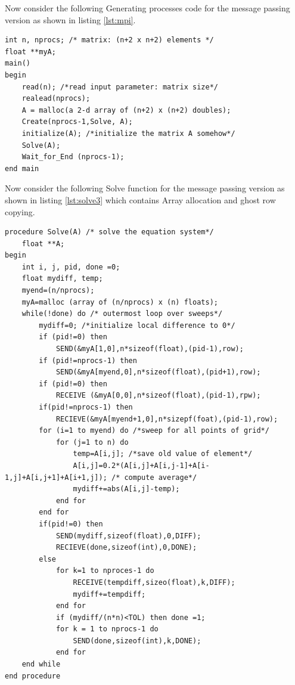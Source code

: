 \documentclass[12pt]{book}
\begin{document}
Now consider the following Generating processes code for the message passing version as shown in listing \ref{lst:mpi}.
\begin{lstlisting}[caption={Message Passing Version - Generating Processes},captionpos=b,label={lst:mpi}]
int n, nprocs; /* matrix: (n+2 x n+2) elements */
float **myA;
main()
begin
    read(n); /*read input parameter: matrix size*/
    realead(nprocs);
    A = malloc(a 2-d array of (n+2) x (n+2) doubles);
    Create(nprocs-1,Solve, A);
    initialize(A); /*initialize the matrix A somehow*/
    Solve(A);
    Wait_for_End (nprocs-1);
end main
\end{lstlisting}

Now consider the following Solve function for the message passing version as shown in listing \ref{lst:solve3}
which contains Array allocation and ghost row copying.
\begin{lstlisting}[caption={MPI - Solve Function},captionpos=b,label={lst:solve3}]
procedure Solve(A) /* solve the equation system*/
    float **A;
begin
    int i, j, pid, done =0;
    float mydiff, temp;
    myend=(n/nprocs);
    myA=malloc (array of (n/nprocs) x (n) floats);
    while(!done) do /* outermost loop over sweeps*/
        mydiff=0; /*initialize local difference to 0*/
        if (pid!=0) then
            SEND(&myA[1,0],n*sizeof(float),(pid-1),row);
        if (pid!=nprocs-1) then
            SEND(&myA[myend,0],n*sizeof(float),(pid+1),row);
        if (pid!=0) then
            RECEIVE (&myA[0,0],n*sizeof(float),(pid-1),rpw);
        if(pid!=nprocs-1) then
            RECIEVE(&myA[myend+1,0],n*sizepf(foat),(pid-1),row);
        for (i=1 to myend) do /*sweep for all points of grid*/
            for (j=1 to n) do
                temp=A[i,j]; /*save old value of element*/
                A[i,j]=0.2*(A[i,j]+A[i,j-1]+A[i-1,j]+A[i,j+1]+A[i+1,j]); /* compute average*/
                mydiff+=abs(A[i,j]-temp);
            end for
        end for
        if(pid!=0) then
            SEND(mydiff,sizeof(float),0,DIFF);
            RECIEVE(done,sizeof(int),0,DONE);
        else
            for k=1 to nproces-1 do
                RECEIVE(tempdiff,sizeo(float),k,DIFF);
                mydiff+=tempdiff;
            end for
            if (mydiff/(n*n)<TOL) then done =1;
            for k = 1 to nprocs-1 do
                SEND(done,sizeof(int),k,DONE);
            end for
    end while
end procedure
\end{lstlisting}
\end{document}
